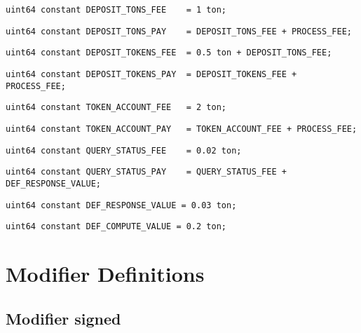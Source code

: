 \begin{lstlisting}[firstnumber=18]
    uint64 constant DEPOSIT_TONS_FEE    = 1 ton;
\end{lstlisting}

\begin{lstlisting}[firstnumber=19]
    uint64 constant DEPOSIT_TONS_PAY    = DEPOSIT_TONS_FEE + PROCESS_FEE;
\end{lstlisting}

\begin{lstlisting}[firstnumber=20]
    uint64 constant DEPOSIT_TOKENS_FEE  = 0.5 ton + DEPOSIT_TONS_FEE;
\end{lstlisting}

\begin{lstlisting}[firstnumber=21]
    uint64 constant DEPOSIT_TOKENS_PAY  = DEPOSIT_TOKENS_FEE + PROCESS_FEE;
\end{lstlisting}

\begin{lstlisting}[firstnumber=22]
    uint64 constant TOKEN_ACCOUNT_FEE   = 2 ton;
\end{lstlisting}

\begin{lstlisting}[firstnumber=23]
    uint64 constant TOKEN_ACCOUNT_PAY   = TOKEN_ACCOUNT_FEE + PROCESS_FEE;
\end{lstlisting}

\begin{lstlisting}[firstnumber=24]
    uint64 constant QUERY_STATUS_FEE    = 0.02 ton;
\end{lstlisting}

\begin{lstlisting}[firstnumber=25]
    uint64 constant QUERY_STATUS_PAY    = QUERY_STATUS_FEE + DEF_RESPONSE_VALUE;
\end{lstlisting}

\begin{lstlisting}[firstnumber=27]
    uint64 constant DEF_RESPONSE_VALUE = 0.03 ton;
\end{lstlisting}

\begin{lstlisting}[firstnumber=28]
    uint64 constant DEF_COMPUTE_VALUE = 0.2 ton;
\end{lstlisting}

\section{Modifier Definitions}


\subsection{Modifier signed}


